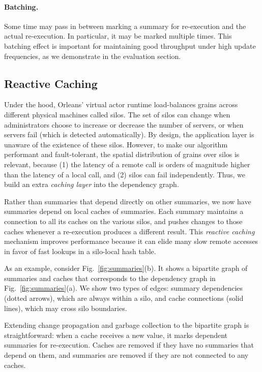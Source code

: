 \paragraph{Batching. } Some time may pass in between marking a summary for re-execution and the actual re-execution. In particular, it may be marked multiple times. This batching effect is important for maintaining good throughput under high update frequencies, as we demonstrate in the evaluation section.

\subsection{Reactive Caching}\label{sec:bp}

Under the hood, Orleans' virtual actor runtime load-balances grains across different physical machines called silos. The set of silos can change when administrators choose to increase or decrease the number of servers, or when servers fail (which is detected automatically). By design, the application layer is unaware of the existence of these silos. However, to make our algorithm performant and fault-tolerant, the spatial distribution of grains over silos is relevant, because (1) the latency of a remote call is orders of magnitude higher than the latency of a local call, and (2) silos can fail independently. Thus, we build an extra \emph{caching layer} into the dependency graph.

Rather than summaries that depend directly on other summaries, we now have summaries depend on local caches of summaries. Each summary maintains a connection to all its caches on the various silos, and pushes changes to those caches whenever a re-execution produces a different result. This \emph{reactive caching} mechanism improves performance because it can elide many slow remote accesses in favor of fast lookups in a silo-local hash table.

As an example, consider Fig.~\ref{fig:summaries}(b). It shows a bipartite graph of summaries and caches that corresponds to the dependency graph in Fig.~\ref{fig:summaries}(a). We show two types of edges: summary dependencies (dotted arrows), which are always within a silo, and cache connections (solid lines), which may cross silo boundaries. 

Extending change propagation and garbage collection to the bipartite graph is straightforward: when a cache receives a new value, it marks dependent summaries for re-execution. Caches are removed if they have no summaries that depend on them, and summaries are removed if they are not connected to any caches. 

